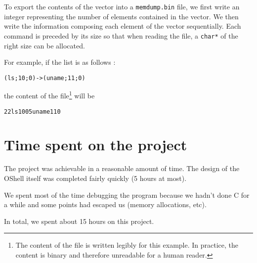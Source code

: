 \documentclass[a4paper, 12pt]{article}
\begin{document}
    To export the contents of the vector into a \texttt{memdump.bin} file, we first write an integer representing the number of elements contained in the vector. We then write the information composing each element of the vector sequentially. Each command is preceded by its size so that when reading the file, a \texttt{char*} of the right size can be allocated.
    
    For example, if the list is as follows :
    
    \begin{center}
        \texttt{(ls;10;0)->(uname;11;0)}
    \end{center}
    
    the content of the file\footnote{The content of the file is written legibly for this example. In practice, the content is binary and therefore unreadable for a human reader.} will be
    
    \begin{center}
        \texttt{22ls1005uname110}
    \end{center}
    
    \section{Time spent on the project}
    
    The project was achievable in a reasonable amount of time. The design of the OShell itself was completed fairly quickly (5 hours at most).
    
    We spent most of the time debugging the program because we hadn't done C for a while and some points had escaped us (memory allocations, etc).
    
    In total, we spent about 15 hours on this project.
\end{document}
